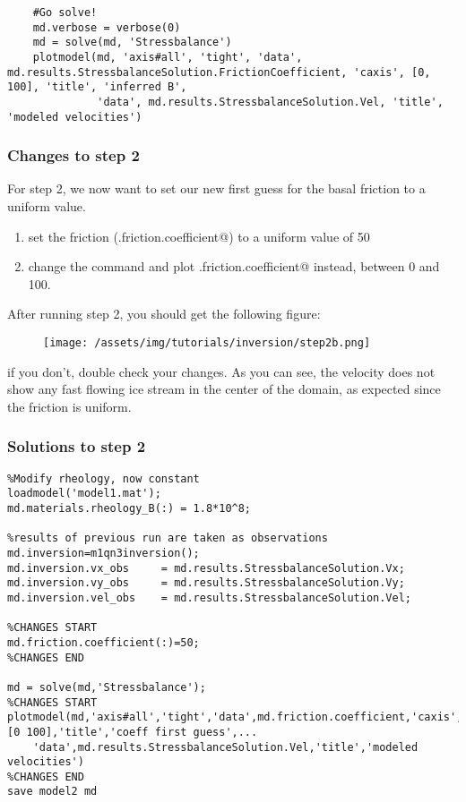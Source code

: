\begin{verbatim}
    #Go solve!
    md.verbose = verbose(0)
    md = solve(md, 'Stressbalance')
    plotmodel(md, 'axis#all', 'tight', 'data', md.results.StressbalanceSolution.FrictionCoefficient, 'caxis', [0, 100], 'title', 'inferred B',
              'data', md.results.StressbalanceSolution.Vel, 'title', 'modeled velocities')\end{verbatim}

\subsubsection{Changes to step 2}
For step 2, we now want to set our new first guess for the basal friction to a uniform value.
\begin{enumerate}
	\item set the friction (\verb@md.friction.coefficient@) to a uniform value of 50
	\item change the \verb@plotmodel@ command and plot \verb@md.friction.coefficient@ instead, between 0 and 100.
\end{enumerate}
After running step 2, you should get the following figure:
\begin{figure}[H]
	\begin{center}
		\texttt{[image: /assets/img/tutorials/inversion/step2b.png]}
	\end{center}
\end{figure}
if you don't, double check your changes. As you can see, the velocity does not show any fast flowing ice stream in the center of the domain, as expected since the friction is uniform.

\subsubsection{Solutions to step 2}
\begin{verbatim}%Modify rheology, now constant
loadmodel('model1.mat');
md.materials.rheology_B(:) = 1.8*10^8;

%results of previous run are taken as observations
md.inversion=m1qn3inversion();
md.inversion.vx_obs		= md.results.StressbalanceSolution.Vx;
md.inversion.vy_obs		= md.results.StressbalanceSolution.Vy;
md.inversion.vel_obs	= md.results.StressbalanceSolution.Vel;

%CHANGES START
md.friction.coefficient(:)=50;
%CHANGES END

md = solve(md,'Stressbalance');
%CHANGES START
plotmodel(md,'axis#all','tight','data',md.friction.coefficient,'caxis',[0 100],'title','coeff first guess',...
	'data',md.results.StressbalanceSolution.Vel,'title','modeled velocities')
%CHANGES END
save model2 md\end{verbatim}

